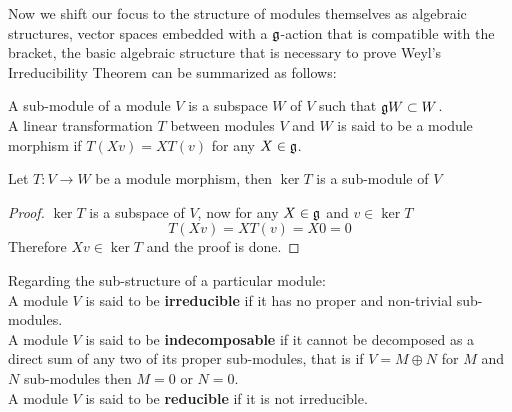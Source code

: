 Now we shift our focus to the structure of modules themselves as algebraic structures, vector spaces embedded with a $\mathfrak{g}$-action that is compatible with the bracket, the basic algebraic structure that is necessary to prove Weyl's Irreducibility Theorem can be summarized as follows:
\begin{defi}
A sub-module of a module $V$ is a subspace $W$ of $V$ such that $\mathfrak{g} W \subset W$.\\
A linear transformation $T$ between modules $V$ and $W$ is said to be a module morphism if $T(Xv)=XT(v)$ for any $X \in \mathfrak{g}$.
\label{module algebra}
\end{defi}

\begin{prop}
	Let $T:V\rightarrow W$ be a module morphism, then $\ker T$ is a sub-module of $V$
	\label{morphism}
\end{prop}
\begin{proof}
	$\ker T$ is a subspace of $V$, now for any $X \in \mathfrak{g}$ and $v \in \ker T$ 
	$$T(Xv) = XT(v) = X0= 0$$
	Therefore $Xv \in \ker T$ and the proof is done.
\end{proof}
\begin{defi}
	Regarding the sub-structure of a particular module:\\
	A module $V$ is said to be \textbf{irreducible} if it has no proper and non-trivial sub-modules.\\
	A module $V$ is said to be \textbf{indecomposable} if it cannot be decomposed as a direct sum of any two of its proper sub-modules, that is if $V=M\oplus N$ for $M$ and $N$ sub-modules then $M=0$ or $N=0$.\\
	A module $V$ is said to be \textbf{reducible} if it is not irreducible.
\label{module-types}
\end{defi}
